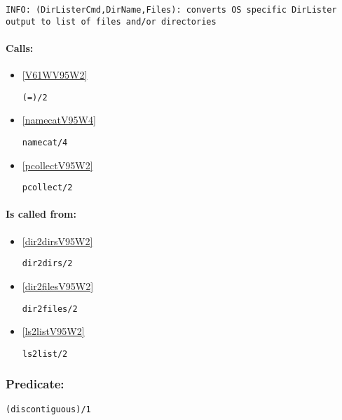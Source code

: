 {\small \begin{verbatim}
INFO: (DirListerCmd,DirName,Files): converts OS specific DirLister output to list of files and/or directories

\end{verbatim}}
\paragraph{Calls:} 
\begin{itemize}
\item \ref{V61WV95W2} 
\begin{verbatim}
(=)/2
\end{verbatim}

\item \ref{namecatV95W4} 
\begin{verbatim}
namecat/4
\end{verbatim}

\item \ref{pcollectV95W2} 
\begin{verbatim}
pcollect/2
\end{verbatim}

\end{itemize}
\paragraph{Is called from:} 
\begin{itemize}
\item \ref{dir2dirsV95W2} 
\begin{verbatim}
dir2dirs/2
\end{verbatim}

\item \ref{dir2filesV95W2} 
\begin{verbatim}
dir2files/2
\end{verbatim}

\item \ref{ls2listV95W2} 
\begin{verbatim}
ls2list/2
\end{verbatim}

\end{itemize}

\subsubsection{Predicate:} \label{discontiguousV95W1}

\begin{verbatim}
(discontiguous)/1
\end{verbatim}

